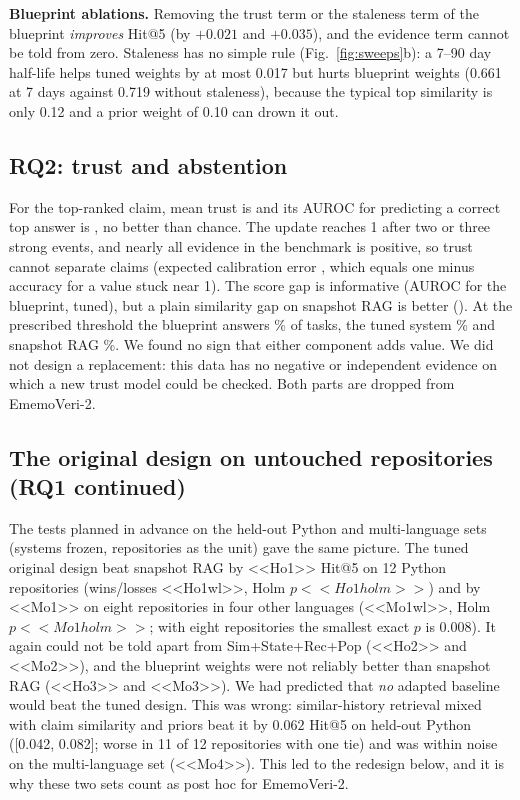 \documentclass[conference]{IEEEtran}
\newcommand{\sys}{EmemoVeri}
\begin{document}
\textbf{Blueprint ablations.} Removing the trust term or the staleness term of the blueprint \emph{improves} Hit@5 (by $+0.021$ and $+0.035$), and the evidence term cannot be told from zero. Staleness has no simple rule (Fig.~\ref{fig:sweeps}b): a 7--90 day half-life helps tuned weights by at most 0.017 but hurts blueprint weights (0.661 at 7 days against 0.719 without staleness), because the typical top similarity is only 0.12 and a prior weight of 0.10 can drown it out.

\subsection{RQ2: trust and abstention}
\label{sec:trust}
For the top-ranked claim, mean trust is \trustMean{} and its AUROC for predicting a correct top answer is \aurocTrustEmv{}, no better than chance. The update reaches 1 after two or three strong events, and nearly all evidence in the benchmark is positive, so trust cannot separate claims (expected calibration error \trustECE{}, which equals one minus accuracy for a value stuck near 1). The score gap is informative (AUROC \aurocGapEmv{} for the blueprint, \aurocGapTuned{} tuned), but a plain similarity gap on snapshot RAG is better (\aurocGapSnap{}). At the prescribed threshold the blueprint answers \covTwentyEmv{}\% of tasks, the tuned system \covTwentyTuned{}\% and snapshot RAG \covTwentySnap{}\%. We found no sign that either component adds value. We did not design a replacement: this data has no negative or independent evidence on which a new trust model could be checked. Both parts are dropped from \sys{}-2.

\subsection{The original design on untouched repositories (RQ1 continued)}
\label{sec:heldout}
The tests planned in advance on the held-out Python and multi-language sets (systems frozen, repositories as the unit) gave the same picture. The tuned original design beat snapshot RAG by <<Ho1>> Hit@5 on 12 Python repositories (wins/losses <<Ho1wl>>, Holm $p<<Ho1holm>>$) and by <<Mo1>> on eight repositories in four other languages (<<Mo1wl>>, Holm $p<<Mo1holm>>$; with eight repositories the smallest exact $p$ is 0.008). It again could not be told apart from Sim+State+Rec+Pop (<<Ho2>> and <<Mo2>>), and the blueprint weights were not reliably better than snapshot RAG (<<Ho3>> and <<Mo3>>). We had predicted that \emph{no} adapted baseline would beat the tuned design. This was wrong: similar-history retrieval mixed with claim similarity and priors beat it by $0.062$ Hit@5 on held-out Python ([0.042, 0.082]; worse in 11 of 12 repositories with one tie) and was within noise on the multi-language set (<<Mo4>>). This led to the redesign below, and it is why these two sets count as post hoc for \sys{}-2.
\end{document}
